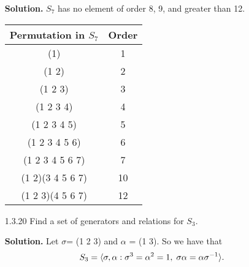 \begin{enumerate}
      \textbf{Solution.} $S_7$ has no element of order 8, 9, and greater than
      12.
      \begin{center}
         \begin{tabular}{@{}|c|c|@{}}   \hline
            Permutation in $S_7$    & Order   \\ \hline
            (1)              & 1       \\ \hline
            (1 2)            & 2       \\ \hline 
            (1 2 3)          & 3       \\ \hline
            (1 2 3 4)        & 4       \\ \hline
            (1 2 3 4 5)      & 5       \\ \hline
            (1 2 3 4 5 6)    & 6       \\ \hline
            (1 2 3 4 5 6 7)  & 7       \\ \hline
            (1 2)(3 4 5 6 7) & 10      \\ \hline
            (1 2 3)(4 5 6 7) & 12      \\ \hline
         \end{tabular}
      \end{center}
   \item[1.3.20]  Find a set of generators and relations for $S_3$.

      \textbf{Solution.} Let $\sigma$= (1 2 3) and $\alpha$ = (1 3). So we have 
      that
      $$S_3 = \langle \sigma, \alpha : \sigma^3 = \alpha^2 = 1, \;
                   \sigma\alpha = \alpha\sigma^{-1} \rangle.$$
\end{enumerate}
